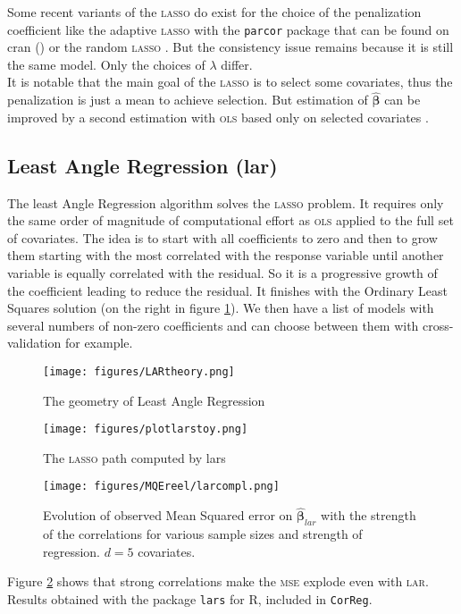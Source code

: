 \documentclass[12pt,a4paper]{report}
\begin{document}

			 Some recent variants of the \textsc{lasso} do exist for the choice of the penalization coefficient like the adaptive \textsc{lasso} \cite{zou2006adaptive} with the {\tt parcor} package that can be found on {\sc cran} (\cite{packageparcor}) or the random \textsc{lasso} \cite{wang2011random}.  But the consistency issue remains because it is still the same model. Only the choices of $\lambda$ differ.\\
			 
			 It is notable that the main goal of the \textsc{lasso} is to select some covariates, thus the penalization is just a mean to achieve selection. But estimation of $\hat{\boldsymbol{\beta}}$ can be improved by a second estimation with \textsc{ols} based only on selected covariates \cite{SAM10088}.
		\subsection{Least Angle Regression  ({\sc lar})}
		The least Angle Regression algorithm solves the \textsc{lasso} problem.
		It requires only the same order of magnitude of computational effort as \textsc{ols} applied to the full set of covariates.
		The idea is to start with all coefficients to zero and then to grow them starting with the most correlated with the response variable until another variable is equally correlated with the residual. So it is a progressive growth of the coefficient leading to reduce the residual. It finishes with the Ordinary Least Squares solution (on the right in figure \ref{plotlarstoy}). We then have a list of models with several numbers of non-zero coefficients and can choose between them with cross-validation for example.\\
		
\begin{figure}[h!]
	\centering
		  \texttt{[image: figures/LARtheory.png]}
		\caption{The geometry of Least Angle Regression}
	\end{figure}
				
\begin{figure}[h!]
	\centering
		  \texttt{[image: figures/plotlarstoy.png]}
		\caption{The \textsc{lasso} path computed by lars}\label{plotlarstoy}
	\end{figure}			
	
		 \begin{figure}
	 \centering
	  \texttt{[image: figures/MQEreel/larcompl.png]}
	  \caption{Evolution of observed Mean Squared error on $\hat{\boldsymbol{\beta}}_{lar}$ with the strength of the correlations for various sample sizes and strength of regression. $d=5$ covariates. } \label{MQElarcompl}
	\end{figure}	
	 Figure \ref{MQElarcompl} shows that strong correlations make the \textsc{mse} explode even with \textsc{lar}. Results obtained with the package {\tt lars} for R, included in {\tt CorReg}.
 	 
\end{document}

